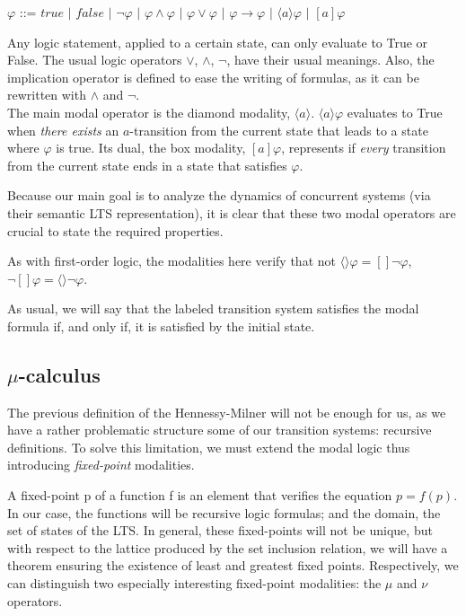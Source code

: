 \documentclass[11pt]{article}
\theoremstyle{definition}
\theoremstyle{plain}
\let\temp\phi
\let\phi\varphi
\let\varphi\temp
\begin{document}
\begin{center}
	$ \phi $ ::= $true$ $ \vert $ $false$ $ \vert $ $\neg \phi$ $ \vert $ $\phi \wedge \phi$ $ \vert $ $\phi \vee \phi$ $ \vert $ $\phi \rightarrow \phi$ $ \vert $ $\langle a \rangle\phi$ $ \vert $ $[a]\phi $
\end{center}

Any logic statement, applied to a certain state, can only evaluate to True or False. The usual logic operators $ \vee $, $ \wedge $, $ \neg $, have their usual meanings. Also, the implication operator is defined to ease the writing of formulas, as it can be rewritten with $ \wedge $ and $ \neg $. \\
The main modal operator is the diamond modality, $ \langle a\rangle $. $ \langle a\rangle\phi $ evaluates to True when \emph{there exists} an $ a $-transition from the current state that leads to a state where $ \phi $ is true. Its dual, the box modality, $ [a]\phi$, represents if \emph{every} transition from the current state ends in a state that satisfies $ \phi $.

Because our main goal is to analyze the dynamics of concurrent systems (via their semantic LTS representation), it is clear that these two modal operators are crucial to state the required properties.

As with first-order logic, the modalities here verify that not $ \langle\rangle\phi = []\neg\phi $, $ \neg[]\phi = \langle\rangle\neg\phi $.

As usual, we will say that the labeled transition system satisfies the modal formula if, and only if, it is satisfied by the initial state.

\subsection{\texorpdfstring{$\mu$}{}-calculus}
The previous definition of the Hennessy-Milner will not be enough for us, as we have a rather problematic structure some of our transition systems: recursive definitions. To solve this limitation, we must extend the modal logic thus introducing \emph{fixed-point} modalities.

A fixed-point p of a function f is an element that verifies the equation $ p = f(p) $. In our case, the functions will be recursive logic formulas; and the domain, the set of states of the LTS. In general, these fixed-points will not be unique, but with respect to the lattice produced by the set inclusion relation, we will have a theorem ensuring the existence of least and greatest fixed points. Respectively, we can distinguish two especially interesting fixed-point modalities: the $ \mu $ and $ \nu $ operators.
\end{document}
